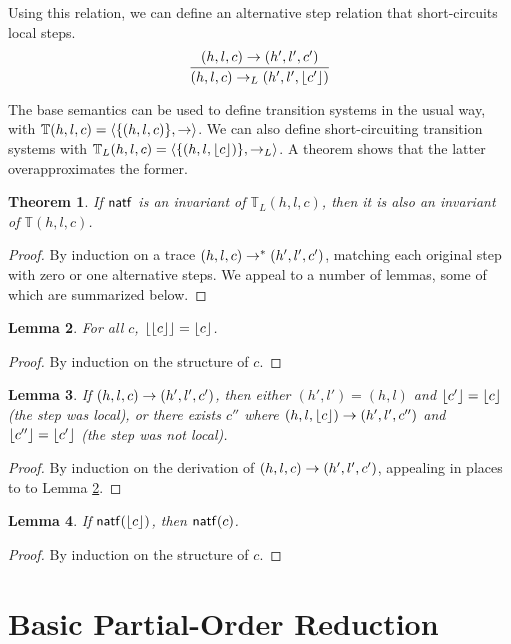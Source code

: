 \documentclass{amsbook}
\newtheorem{theorem}{Theorem}[chapter]
\newtheorem{lemma}[theorem]{Lemma}
\theoremstyle{definition}
\theoremstyle{remark}
\numberwithin{section}{chapter}
\numberwithin{equation}{chapter}
\begin{document}
\newcommand{\smallstepL}[2]{#1 \to_L #2}

Using this relation, we can define an alternative step relation that short-circuits local steps.
$$\infer{\smallstepL{(h, l, c)}{(h', l', \rl{c'})}}{
  \smallstep{(h, l, c)}{(h', l', c')}
}$$

The base semantics can be used to define transition systems in the usual way, with $\mathbb T(h, l, c) = {\left \langle \{(h, l, c)\}, \to \right \rangle}$.
We can also define short-circuiting transition systems with $\mathbb T_L(h, l, c) = {\left \langle \{(h, l, {\left \lfloor c \right \rfloor})\}, \to_L \right \rangle}$.
A theorem shows that the latter overapproximates the former.

\abstraction
\begin{theorem}\label{local}
  If $\mathsf{natf}$ is an invariant of $\mathbb T_L(h, l, c)$, then it is also an invariant of $\mathbb T(h, l, c)$.
\end{theorem}
\begin{proof}
  By induction on a trace $(h, l, c) \to^* (h', l', c')$, matching each original step with zero or one alternative steps.
  We appeal to a number of lemmas, some of which are summarized below.
\end{proof}

\begin{lemma}\label{rl_idem}
  For all $c$, ${\left \lfloor {\left \lfloor c \right \rfloor} \right \rfloor} = {\left \lfloor c \right \rfloor}$.
\end{lemma}
\begin{proof}
  By induction on the structure of $c$.
\end{proof}

\begin{lemma}
  If $(h, l, c) \to (h', l', c')$, then either $(h', l') = (h, l)$ and ${\left \lfloor c' \right \rfloor} = {\left \lfloor c \right \rfloor}$ (the step was local), or there exists $c''$ where $(h, l, {\left \lfloor c \right \rfloor}) \to (h', l', c'')$ and ${\left \lfloor c'' \right \rfloor} = {\left \lfloor c' \right \rfloor}$ (the step was not local).
\end{lemma}
\begin{proof}
  By induction on the derivation of $(h, l, c) \to (h', l', c')$, appealing in places to to Lemma \ref{rl_idem}.
\end{proof}

\begin{lemma}
  If $\mathsf{natf}({\left \lfloor c \right \rfloor})$, then $\mathsf{natf}(c)$.
\end{lemma}
\begin{proof}
  By induction on the structure of $c$.
\end{proof}


\section{Basic Partial-Order Reduction}
\end{document}
